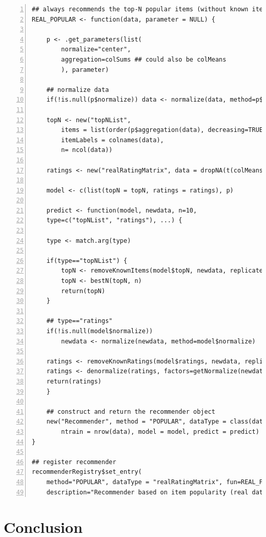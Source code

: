\documentclass[nojss]{jss}
\begin{document}
\begin{table}
\caption{Defining and registering a new recommender algorithm.}
\label{table:newalg}
\begin{Verbatim}[gobble=0, numbers=left]
## always recommends the top-N popular items (without known items)
REAL_POPULAR <- function(data, parameter = NULL) {

    p <- .get_parameters(list(
		normalize="center",
		aggregation=colSums ## could also be colMeans
		), parameter)

    ## normalize data
    if(!is.null(p$normalize)) data <- normalize(data, method=p$normalize)

    topN <- new("topNList", 
	    items = list(order(p$aggregation(data), decreasing=TRUE)),
	    itemLabels = colnames(data),
	    n= ncol(data))

    ratings <- new("realRatingMatrix", data = dropNA(t(colMeans(data))))

    model <- c(list(topN = topN, ratings = ratings), p)

    predict <- function(model, newdata, n=10, 
	type=c("topNList", "ratings"), ...) {

	type <- match.arg(type)

	if(type=="topNList") {
	    topN <- removeKnownItems(model$topN, newdata, replicate=TRUE)
	    topN <- bestN(topN, n)
	    return(topN)
	}

	## type=="ratings"
	if(!is.null(model$normalize)) 
	    newdata <- normalize(newdata, method=model$normalize)

	ratings <- removeKnownRatings(model$ratings, newdata, replicate=TRUE)
	ratings <- denormalize(ratings, factors=getNormalize(newdata))
	return(ratings)
    }

    ## construct and return the recommender object
    new("Recommender", method = "POPULAR", dataType = class(data),
	    ntrain = nrow(data), model = model, predict = predict)
}

## register recommender
recommenderRegistry$set_entry(
	method="POPULAR", dataType = "realRatingMatrix", fun=REAL_POPULAR, 
	description="Recommender based on item popularity (real data).")
\end{Verbatim}
\end{table}


\section{Conclusion}
\label{sec:conclusion}
\end{document}
